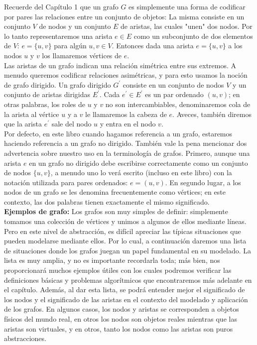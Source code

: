 \documentclass[a4paper, 12pt]{book}
\theoremstyle{dotless}
\begin{document}
Recuerde del Capítulo 1 que un grafo $G$ es simplemente una forma de codificar por pares las
relaciones entre un conjunto de objetos: La misma consiste en un conjunto $V$ de nodos
y un conjunto $E$ de aristas, las cuales "unen" dos nodos. Por lo tanto
representaremos una arista $e \in E$ como un subconjunto de dos elementos de $V$: $e = \{u, v\}$ para algún $u, v \in V$.  Entonces dada una arista  $e = \{u, v\}$ a los nodos $u$ y $v$ los llamaremos vértices de $e$.\\

Las aristas de un grafo indican una relación simétrica entre sus extremos.
A menudo queremos codificar relaciones asimétricas, y para esto usamos la
noción de grafo dirigido. Un grafo dirigido $G^{'}$ consiste en un conjunto
de nodos $V$ y un conjunto de aristas dirigidas $E^{'}$.  Cada $e^{'} \in E^{'}$ es un par ordenado $(u, v)$; en otras palabras, los roles de $u$ y $v$ no son intercambiables,   denominaremos cola de la arista al vértice $u$ y a $v$ le llamaremos la cabeza de $e$. Aveces, también diremos que la arista $e^{'}$ sale del nodo $u$ y entra en el nodo $v$. \\

Por defecto, en este libro cuando hagamos referencia a un grafo, estaremos haciendo referencia a un grafo no dirigido. También vale la pena mencionar dos advertencia sobre nuestro uso en la terminología de grafos. Primero, aunque una arista $e$ en un grafo no dirigido debe escribirse correctamente como un conjunto de nodos $\{u, v\}$,  a menudo uno lo verá escrito (incluso en este libro) con la notación utilizada para pares ordenados: $e = (u,v)$. En segundo lugar, a los nodos de un grafo se les denomina frecuentemente como vértices; en este contexto, las dos palabras tienen exactamente el mismo significado.  \\

\textbf{Ejemplos de grafo:} Los grafos son muy simples de definir: simplemente tomamos una colección
de vértices y unimos a algunos de ellos mediante líneas. Pero en este nivel de abstracción,
es difícil apreciar las típicas situaciones que pueden modelarse mediante ellos. Por lo cual, a continuación daremos una lista de situaciones donde los grafos juegan un papel fundamental en su modelado. La lista es muy amplia, y no es importante recordarla toda; más bien, nos proporcionará muchos ejemplos útiles con los cuales podremos verificar las definiciones básicas y problemas algorítmicos que encontraremos más adelante en el capítulo. Además, al dar esta lista, se podrá entender mejor el significado de los nodos y el significado de las aristas en
el contexto del modelado y aplicación de los grafos. En algunos casos, los nodos y aristas se corresponden a objetos físicos del mundo real, en otros los nodos son objetos reales
mientras que las aristas son virtuales, y en otros, tanto los nodos como las aristas son puros
abstracciones. \\
\end{document}
